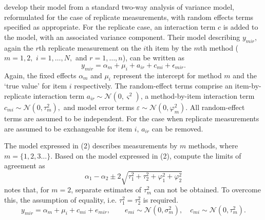 \documentclass[12pt, a4paper]{report}
\theoremstyle{plain}
\theoremstyle{definition}
\theoremstyle{remark}
\begin{document}
\citet{BXC2008} develop their model from a standard two-way analysis of variance model, reformulated for the case of replicate measurements, with random effects terms specified as appropriate. 
For the replicate case, an interaction term $c$ is added to the model, with an associated variance component. Their model describing $y_{mir} $, again the $r$th replicate measurement on the $i$th item by the $m$th method ($m=1,2,$ $i=1,\ldots,N,$ and $r = 1,\ldots,n$), can be written as
\begin{equation}\label{BXC-model}
y_{mir}  = \alpha_{m} + \mu_{i} + a_{ir} + c_{mi} + \epsilon_{mir}.
\end{equation}
Again, the fixed effects $\alpha_{m}$ and $\mu_{i}$  represent the intercept for method $m$ and the `true value' for item $i$ respectively. The random-effect terms comprise an item-by-replicate interaction term $a_{ir} \sim \mathcal{N}(0,\varsigma^{2})$, a method-by-item interaction term $c_{mi} \sim \mathcal{N}(0,\tau^{2}_{m}),$ and model error terms $\varepsilon \sim \mathcal{N}(0,\varphi^{2}_{m}).$ All random-effect terms are assumed to be independent. For the case when replicate measurements are assumed to be exchangeable for item $i$, $a_{ir}$ can be removed.

The model expressed in (2) describes measurements by $m$ methods, where $m = \{1,2,3\ldots\}$. Based on the model expressed in (2), \citet{BXC2008} compute the limits of agreement as
\[
\alpha_1 - \alpha_2 \pm 2 \sqrt{ \tau^2_1 +  \tau^2_2 +  \varphi^2_1 +  \varphi^2_2 }
\]
\citet{BXC2008} notes that, for $m=2$, separate estimates of $\tau^2_m$ can not be obtained. To overcome this, the assumption of equality, i.e. $\tau^2_1 = \tau^2_2$ is required.
\begin{equation}
y_{mir}  = \alpha_{m} + \mu_{i} + c_{mi} + e_{mir}, \qquad  e_{mi}
\sim \mathcal{N}(0,\sigma^{2}_{m}), \quad c_{mi} \sim \mathcal{N}(0,\tau^{2}_{m}).
\end{equation}

\end{document}
